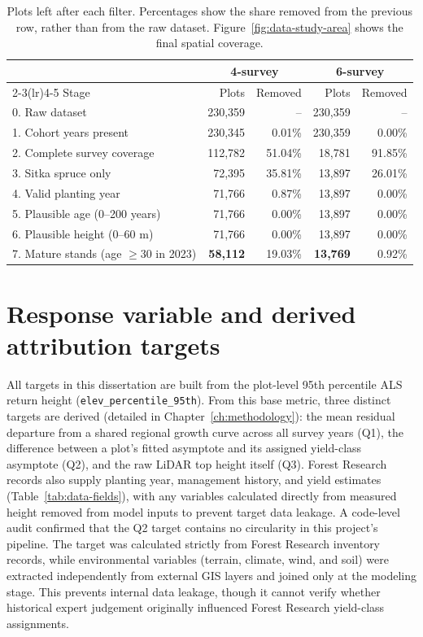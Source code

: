 \begin{table}[!htbp]
\centering
\scriptsize
\begin{tabular}{lrrrr}
\toprule
& \multicolumn{2}{c}{4-survey} & \multicolumn{2}{c}{6-survey} \\
\cmidrule(lr){2-3}\cmidrule(lr){4-5}
Stage & Plots & Removed & Plots & Removed \\
\midrule
0. Raw dataset
& 230,359 & -- & 230,359 & -- \\
1. Cohort years present
& 230,345 & 0.01\% & 230,359 & 0.00\% \\
2. Complete survey coverage
& 112,782 & 51.04\% & 18,781 & 91.85\% \\
3. Sitka spruce only
& 72,395 & 35.81\% & 13,897 & 26.01\% \\
4. Valid planting year
& 71,766 & 0.87\% & 13,897 & 0.00\% \\
5. Plausible age (0--200 years)
& 71,766 & 0.00\% & 13,897 & 0.00\% \\
6. Plausible height (0--60 m)
& 71,766 & 0.00\% & 13,897 & 0.00\% \\
7. Mature stands (age $\geq 30$ in 2023)
& \textbf{58,112} & 19.03\%
& \textbf{13,769} & 0.92\% \\
\bottomrule
\end{tabular}
\caption{\small{Plots left after each filter. Percentages show the share removed from the previous row, rather than from the raw dataset. Figure~\ref{fig:data-study-area} shows the final spatial coverage.}}
\label{tab:data-cleaning-funnel}
\end{table}

\section{Response variable and derived attribution targets}

All targets in this dissertation are built from the plot-level 95th percentile ALS return height (\texttt{elev\_percentile\_95th}). From this base metric, three distinct targets are derived (detailed in Chapter~\ref{ch:methodology}): the mean residual departure from a shared regional growth curve across all survey years (Q1), the difference between a plot's fitted asymptote and its assigned yield-class asymptote (Q2), and the raw LiDAR top height itself (Q3). Forest Research records also supply planting year, management history, and yield estimates (Table~\ref{tab:data-fields}), with any variables calculated directly from measured height removed from model inputs to prevent target data leakage. A code-level audit confirmed that the Q2 target contains no circularity in this project's pipeline. The target was calculated strictly from Forest Research inventory records, while environmental variables (terrain, climate, wind, and soil) were extracted independently from external GIS layers and joined only at the modeling stage. This prevents internal data leakage, though it cannot verify whether historical expert judgement originally influenced Forest Research yield-class assignments.


